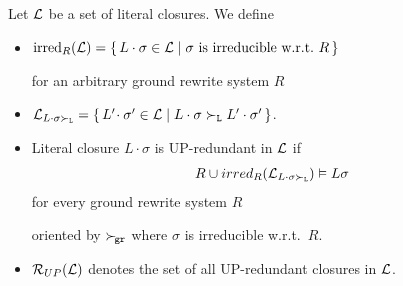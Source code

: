    \begin{definition}[UP-Redundancy]
        Let \( \mathcal{L} \) be a set of literal closures. We define
       \begin{itemize}
           \item \( \operatorname{irred}_R(\mathcal{L}) =
           \{ \,
            L\cdot\sigma\in\mathcal{L} \mid
           \sigma\text{ is irreducible w.r.t.~}R
           \, \} \)

        for an arbitrary ground rewrite system \( R \)

       \item
       \(
       \mathcal{L}_{L\cdot\sigma\mathrel\succ_{\mathtt{L}}} =
       \{ \,
        L'\!\cdot\sigma'\in\mathcal{L} \mid
        L\cdot\sigma\mathrel\succ_{\mathtt{L}} L'\cdot\sigma'
       \, \}
         \).

       \item Literal closure \( L\cdot\sigma \) is UP-redundant in \( \mathcal{L} \) if
       \begin{gather*}
            R \cup irred_R(\mathcal{L}_{L\cdot\sigma\mathrel\succ_{\mathtt{L}}}) \vDash L\sigma
       \end{gather*}
        for every ground rewrite system \( R \)

        oriented by \( \mathrel\succ_{\!\mathtt{gr}} \)
        where \( \sigma \) is irreducible w.r.t.~\( R \).

       \item
       \( \mathcal{R}_{UP}(\mathcal{L}) \) denotes the set of all UP-redundant closures in \( \mathcal{L} \).
   \end{itemize}
\end{definition}

